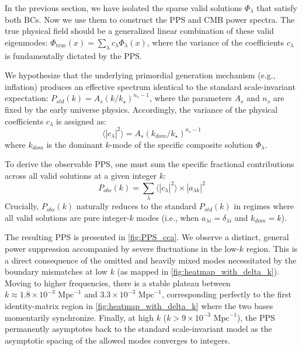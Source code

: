 In the previous section, we have isolated the sparse valid solutions $\Phi_\lambda$ that satisfy both BCs. Now we use them to construct the PPS and CMB power spectra. The true physical field should be a generalized linear combination of these valid eigenmodes: $\varPhi_{\text{true}}(x) = \sum_\lambda c_\lambda \Phi_\lambda(x)$, where the variance of the coefficients $c_\lambda$ is fundamentally dictated by the PPS.

We hypothesize that the underlying primordial generation mechanism (e.g., inflation) produces an effective spectrum identical to the standard scale-invariant expectation: $P_{std}(k)=A_s(k/k_\star)^{n_s-1}$, where the parameters $A_s$ and $n_s$ are fixed by the early universe physics. Accordingly, the variance of the physical coefficients $c_\lambda$ is assigned as:
\[ \langle |c_\lambda|^2 \rangle =A_s (k_{dom}/k_\star)^{n_s-1}\]
where $k_{dom}$ is the dominant $k$-mode of the specific composite solution $\Phi_\lambda$.

To derive the observable PPS, one must sum the specific fractional contributions across all valid solutions at a given integer $k$:
\begin{equation}
    P_{obs}(k) = \sum_\lambda \langle |c_\lambda|^2 \rangle \times |a_{\lambda k}|^2
\end{equation}
Crucially, $P_{obs}(k)$ naturally reduces to the standard $P_{std}(k)$ in regimes where all valid solutions are pure integer-$k$ modes (i.e., when $a_{\lambda i}=\delta_{\lambda i}$ and $k_{dom}=k$). 

The resulting PPS is presented in \cref{fig:PPS_cca}. We observe a distinct, general power suppression accompanied by severe fluctuations in the low-$k$ region. This is a direct consequence of the omitted and heavily mixed modes necessitated by the boundary mismatches at low $k$ (as mapped in \cref{fig:heatmap_with_delta_k}). Moving to higher frequencies, there is a stable plateau between $k \approx 1.8 \times 10^{-3} \text{ Mpc}^{-1}$ and $3.3\times 10^{-3} \text{ Mpc}^{-1}$, corresponding perfectly to the first identity-matrix region in \cref{fig:heatmap_with_delta_k} where the two bases momentarily synchronize. Finally, at high $k$ ($k > 9\times 10^{-3} \text{ Mpc}^{-1}$), the PPS permanently asymptotes back to the standard scale-invariant model as the asymptotic spacing of the allowed modes converges to integers.

